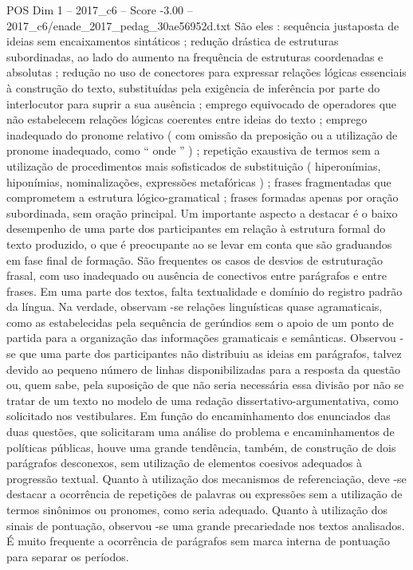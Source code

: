 \begin{textsample}{POS Dim 1 – 2017\_c6 – Score -3.00 – 2017\_c6/enade\_2017\_pedag\_30ae56952d.txt}
São eles : sequência justaposta de ideias sem encaixamentos sintáticos ; redução drástica de estruturas subordinadas, ao lado do aumento na frequência de estruturas coordenadas e absolutas ; redução no uso de conectores para expressar relações lógicas essenciais à construção do texto, substituídas pela exigência de inferência por parte do interlocutor para suprir a sua ausência ; emprego equivocado de operadores que não estabelecem relações lógicas coerentes entre ideias do texto ; emprego inadequado do pronome relativo ( com omissão da preposição ou a utilização de pronome inadequado, como “ onde ” ) ; repetição exaustiva de termos sem a utilização de procedimentos mais sofisticados de substituição ( hiperonímias, hiponímias, nominalizações, expressões metafóricas ) ; frases fragmentadas que comprometem a estrutura lógico-gramatical ; frases formadas apenas por oração subordinada, sem oração principal.
Um importante aspecto a destacar é o baixo desempenho de uma parte dos participantes em relação à estrutura formal do texto produzido, o que é preocupante ao se levar em conta que são graduandos em fase final de formação.
São frequentes os casos de desvios de estruturação frasal, com uso inadequado ou ausência de conectivos entre parágrafos e entre frases.
Em uma parte dos textos, falta textualidade e domínio do registro padrão da língua.
Na verdade, observam -se relações linguísticas quase agramaticais, como as estabelecidas pela sequência de gerúndios sem o apoio de um ponto de partida para a organização das informações gramaticais e semânticas.
Observou -se que uma parte dos participantes não distribuiu as ideias em parágrafos, talvez devido ao pequeno número de linhas disponibilizadas para a resposta da questão ou, quem sabe, pela suposição de que não seria necessária essa divisão por não se tratar de um texto no modelo de uma redação dissertativo-argumentativa, como solicitado nos vestibulares.
Em função do encaminhamento dos enunciados das duas questões, que solicitaram uma análise do problema e encaminhamentos de políticas públicas, houve uma grande tendência, também, de construção de dois parágrafos desconexos, sem utilização de elementos coesivos adequados à progressão textual.
Quanto à utilização dos mecanismos de referenciação, deve -se destacar a ocorrência de repetições de palavras ou expressões sem a utilização de termos sinônimos ou pronomes, como seria adequado.
Quanto à utilização dos sinais de pontuação, observou -se uma grande precariedade nos textos analisados.
É muito frequente a ocorrência de parágrafos sem marca interna de pontuação para separar os períodos.

\end{textsample}
